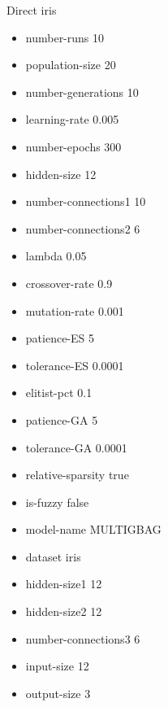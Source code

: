 Direct
iris
\begin{itemize}
\item number-runs 10
\item population-size 20
\item number-generations 10
\item learning-rate 0.005
\item number-epochs 300
\item hidden-size 12
\item number-connections1 10
\item number-connections2 6
\item lambda 0.05
\item crossover-rate 0.9
\item mutation-rate 0.001
\item patience-ES 5
\item tolerance-ES 0.0001
\item elitist-pct 0.1
\item patience-GA 5
\item tolerance-GA 0.0001
\item relative-sparsity true
\item is-fuzzy false
\item model-name MULTIGBAG
\item dataset iris
\item hidden-size1 12
\item hidden-size2 12
\item number-connections3 6
\item input-size 12
\item output-size 3
\end{itemize}

